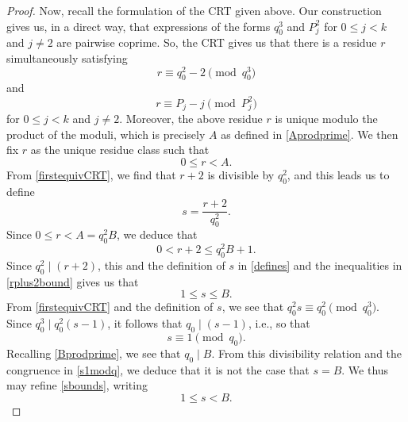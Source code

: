 \documentclass[12pt]{article}
\begin{document}
\begin{proof}
 Now, recall the formulation of the CRT given above. 
 Our construction gives us, in a direct way, 
 that expressions of the forms $q_0^3$ and $P_j^2$ for $0 \leq j < k$ and $j \neq 2$
 are pairwise coprime. 
 So, the CRT gives us that there is a residue $r$ simultaneously satisfying 
\begin{equation}\label{firstequivCRT} 
 r \equiv q_0^2 - 2 \pmod {q_{0}^{3}} 
\end{equation}
 and 
\begin{equation}\label{secondequivCRT} 
 r \equiv P_j - j \pmod {P_{j}^{2}} 
\end{equation}
 for $0 \leq j < k$ and $ j \neq 2$. Moreover, 
 the above residue $r$ is unique modulo the product of the moduli, which is precisely $A$ as defined in 
 \eqref{Aprodprime}. We then fix $r$ as the unique residue class such that 
\begin{equation}\label{rbounds} 
 0 \leq r < A.
\end{equation}
 From \eqref{firstequivCRT}, we find that 
 $r+2$ is divisible by $q_0^2$, and this leads us to define 
\begin{equation}\label{defines} 
 s = \frac{r+2}{q_0^2}. 
\end{equation}
 Since $0 \leq r < A = q_0^2 B$, we deduce that 
\begin{equation}\label{rplus2bound} 
 0 < r + 2 \leq q_0^2 B + 1. 
\end{equation}
 Since $q_0^2 \mid (r+2)$, this and the definition of $s$ in \eqref{defines}
 and the inequalities in \eqref{rplus2bound} gives us that 
\begin{equation}\label{sbounds} 
 1 \leq s \leq B. 
\end{equation}
 From \eqref{firstequivCRT} and the definition of $s$, 
 we see that 
 $ q_0^2 s \equiv q_0^2 \pmod {q_{0}^{3}}$. 
 Since $q_0^3 \mid q_0^2 (s-1)$, 
 it follows that $q_0 \mid (s-1)$, 
 i.e., so that 
\begin{equation}\label{s1modq} 
 s \equiv 1 \pmod {{q}_{0}}.
\end{equation}
 Recalling \eqref{Bprodprime}, we see that $q_0 \mid B$. From this divisibility relation
 and the congruence in \eqref{s1modq}, we deduce that it is not the case that $s= B$. 
 We thus may refine \eqref{sbounds}, writing 
\begin{equation}\label{stricts} 
 1 \leq s < B. 
\end{equation} 


\end{proof}
\end{document}
